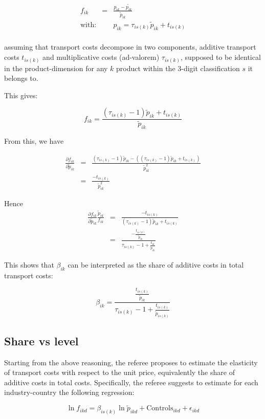 \documentclass[a4paper,12pt]{article}
\begin{document}
\begin{eqnarray*}
f_{ik} &=& \frac{p_{ik}-\tilde{p_{ik}}}{\tilde{p}_{ik}}\\
\text{with}:&& p_{ik} = \tau_{is(k)}\tilde{p}_{ik} + t_{is(k)} \\
\end{eqnarray*}

assuming that transport costs decompose in two components, additive transport costs $t_{is(k)}$ and multiplicative costs (ad-valorem) $\tau_{is(k)}$, supposed to be identical in the product-dimension for any $k$ product within the 3-digit classification $s$ it belongs to.

This gives:

$$f_{ik} = \frac{(\tau_{is(k)}-1)\tilde{p}_{ik}+t_{is(k)}}{\tilde{p}_{ik}}$$

From this, we have

\begin{eqnarray*}
\frac{\partial f_{ik}}{\partial \tilde{p}_{ik}} &=& \frac{(\tau_{is(k)}-1)\tilde{p}_{ik} - ((\tau_{is(k)}-1)\tilde{p}_{ik} +t_{is(k)})}{\tilde{p}_{ik}^2} \\
&=& \frac{-t_{is(k)}}{\tilde{p}_{ik}^2}
\end{eqnarray*}

Hence
\begin{eqnarray*}
\frac{\partial f_{ik}}{\partial \tilde{p}_{ik}} \frac{\tilde{p}_{ik}}{f_{ik}}&=& \frac{-t_{is(k)}}{(\tau_{is(k)}-1)\tilde{p}_{ik} +t_{is(k)}}\\
&=& \frac{-\frac{t_{is(k)}}{\tilde{p}_{ik}}}{\tau_{is(k)}-1 +\frac{t_{ik}}{\tilde{p}_{ik}}}
\end{eqnarray*}

This shows that $\beta_{ik}$ can be interpreted as the share of additive costs in total transport costs:

$$\beta_{ik} = \frac{\frac{t_{is(k)}}{\tilde{p}_{ik}}}{\tau_{is(k)}-1 + \frac{t_{is(k)}}{\tilde{p}_{is(k)}}} $$


\subsection{Share vs level}

Starting from the above reasoning, the referee proposes to estimate the elasticity of transport costs with respect to the unit price, equivalently the share of additive costs in total costs. Specifically, the referee suggests to estimate for each industry-country the following regression:

$$\ln f_{ikd}= \beta_{is(k)} \ln \widetilde{p}_{ikd} + \text{Controls}_{ikd} +\epsilon_{ikd}$$
\end{document}

